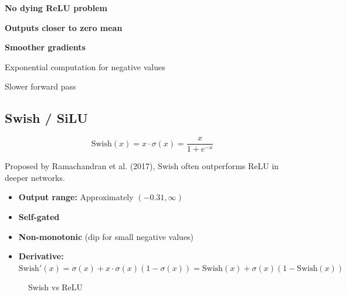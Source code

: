 \begin{advantages}
    \item \textbf{No dying ReLU problem}
    \item \textbf{Outputs closer to zero mean}
    \item \textbf{Smoother gradients}
\end{advantages}

\begin{disadvantages}
    \item Exponential computation for negative values
    \item Slower forward pass
\end{disadvantages}

\subsection{Swish / SiLU}

\begin{equation}
\text{Swish}(x) = x \cdot \sigma(x) = \frac{x}{1 + e^{-x}}
\end{equation}

Proposed by Ramachandran et al. (2017), Swish often outperforms ReLU in deeper networks.

\begin{properties}
\begin{itemize}
    \item \textbf{Output range:} Approximately $(-0.31, \infty)$
    \item \textbf{Self-gated}
    \item \textbf{Non-monotonic} (dip for small negative values)
    \item \textbf{Derivative:} $\text{Swish}'(x) = \sigma(x) + x \cdot \sigma(x)(1 - \sigma(x)) = \text{Swish}(x) + \sigma(x)(1 - \text{Swish}(x))$
\end{itemize}
\end{properties}

\begin{figure}[h]
    \centering
    \caption[Swish activation function]{Swish vs ReLU}
    \label{fig:swish}
\end{figure}

